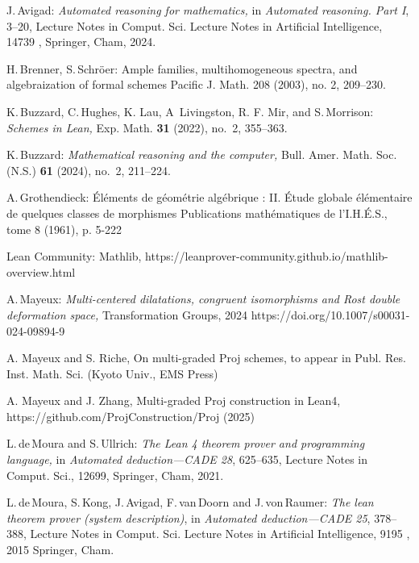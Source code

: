\documentclass[graybox]{svmult}
\begin{document}
 \begin{thebibliography}{99.}


 J.\,Avigad: {\it Automated reasoning for mathematics,} in {\it Automated reasoning. Part I}, 3--20, Lecture Notes in Comput. Sci. Lecture Notes in Artificial Intelligence, 14739 , Springer, Cham, 2024.

 H.\,Brenner, S.\,Schröer: {Ample families, multihomogeneous spectra, and algebraization of formal schemes} Pacific J. Math. 208 (2003), no. 2, 209–230.

 K.\,Buzzard, C.\,Hughes, K. Lau, A\,
              Livingston, R. F. Mir, and S.\,Morrison: {\it Schemes in Lean,} Exp. Math. {\bf 31} (2022), no.~2, 355--363.
                 
              
              
 K.\,Buzzard: {\it Mathematical reasoning and the computer,} Bull. Amer. Math. Soc. (N.S.) {\bf 61} (2024), no.~2, 211--224.  



 A.\,Grothendieck: {Éléments de géométrie algébrique : II. Étude globale élémentaire de quelques classes de morphismes} Publications mathématiques de l’I.H.É.S., tome 8 (1961), p. 5-222

 Lean Community: {Mathlib}, https://leanprover-community.github.io/mathlib-overview.html



 A.\,Mayeux: {\it Multi-centered dilatations, congruent isomorphisms and Rost double deformation space,}
Transformation Groups, 2024 https://doi.org/10.1007/s00031-024-09894-9



A. Mayeux and S. Riche, On multi-graded Proj schemes, to appear in Publ. Res. Inst. Math. Sci. (Kyoto Univ., EMS Press)



A. Mayeux and J. Zhang, Multi-graded Proj construction in Lean4, https://github.com/ProjConstruction/Proj (2025)

L.\,de\,Moura and S.\,Ullrich: {\it The Lean 4 theorem prover and programming language,} in {\it Automated deduction---CADE 28}, 625--635, Lecture Notes in Comput. Sci., 12699, Springer, Cham, 2021.

L.\,de\,Moura, S.\,Kong, J.\,Avigad, F.\,van\,Doorn and J.\,von\,Raumer: {\it The lean theorem prover (system description)}, in {\it Automated deduction---CADE 25}, 378--388, Lecture Notes in Comput. Sci. Lecture Notes in Artificial Intelligence, 9195 , 2015 Springer, Cham.


\end{thebibliography}
\end{document}
